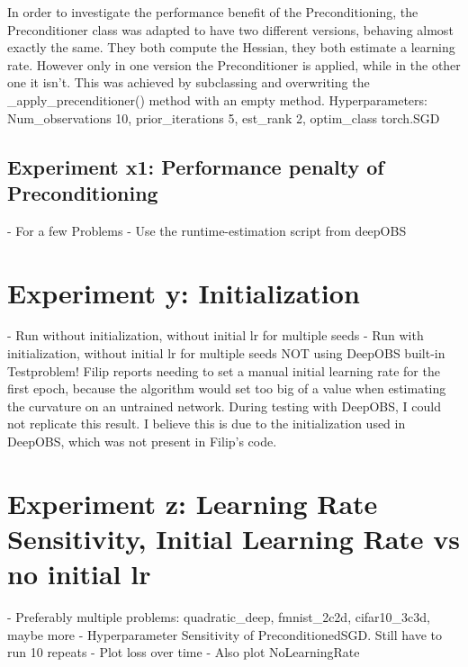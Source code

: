 \documentclass[twoside,12pt,a4paper]{report}
\begin{document}
In order to investigate the performance benefit of the Preconditioning, the Preconditioner class was adapted to have two different versions, behaving almost exactly the same. They both compute the Hessian, they both estimate a learning rate. However only in one version the Preconditioner is applied, while in the other one it isn't. This was achieved by subclassing and overwriting the \_apply\_precenditioner() method with an empty method. Hyperparameters: Num\_observations 10, prior\_iterations 5, est\_rank 2, optim\_class torch.SGD

\subsection{Experiment x1: Performance penalty of Preconditioning}
- For a few Problems
- Use the runtime-estimation script from deepOBS

\section{Experiment y: Initialization}
- Run without initialization, without initial lr for multiple seeds
- Run with initialization, without initial lr for multiple seeds
NOT using DeepOBS built-in Testproblem!
Filip reports needing to set a manual initial learning rate for the first epoch, because the algorithm would set too big of a value when estimating the curvature on an untrained network. During testing with DeepOBS, I could not replicate this result. I believe this is due to the initialization used in DeepOBS, which was not present in Filip's code.

\section{Experiment z: Learning Rate Sensitivity,  Initial Learning Rate vs no initial lr}
- Preferably multiple problems: quadratic\_deep, fmnist\_2c2d, cifar10\_3c3d, maybe more
- Hyperparameter Sensitivity of PreconditionedSGD. Still have to run 10 repeats
- Plot loss over time
- Also plot NoLearningRate
\end{document}
